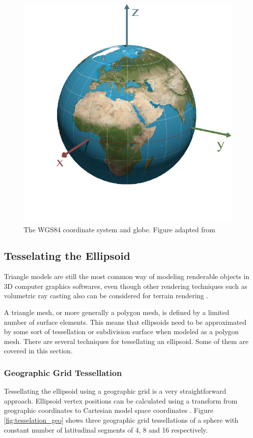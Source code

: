 \begin{figure}
\centering
\includegraphics[scale=0.25]{figures/wgs84.jpg}
\caption{The WGS84 coordinate system and globe. Figure adapted from \cite{mapprojections}}
\label{fig:wgs84}
\end{figure}

\subsection{Tesselating the Ellipsoid}

Triangle models are still the most common way of modeling renderable objects in 3D computer graphics softwares, even though other rendering techniques such as volumetric ray casting also can be considered for terrain rendering \cite[p. 149]{cozzi11}.

A triangle mesh, or more generally a polygon mesh, is defined by a limited number of surface elements. This means that ellipsoids need to be approximated by some sort of tessellation or subdivision surface when modeled as a polygon mesh. There are several techniques for tessellating an ellipsoid. Some of them are covered in this section.

\subsubsection{Geographic Grid Tessellation}
\label{sec:geogrid}
Tessellating the ellipsoid using a geographic grid is a very straightforward approach. Ellipsoid vertex positions can be calculated using a transform from geographic coordinates to Cartesian model space coordinates \cite[p. 25]{cozzi11}. Figure \ref{fig:tesselation_geo} shows three geographic grid tessellations of a sphere with constant number of latitudinal segments of 4, 8 and 16 respectively.

